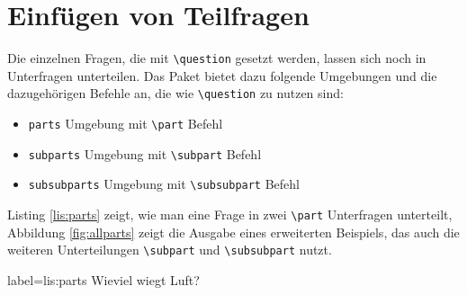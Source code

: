 \clearpage

\section{Einfügen von Teilfragen}

Die einzelnen Fragen, die mit \texttt{\textbackslash question} gesetzt werden, lassen sich noch in Unterfragen unterteilen. 
Das  Paket bietet dazu folgende Umgebungen und die dazugehörigen Befehle an, die wie \texttt{\textbackslash question} zu nutzen sind:

\begin{itemize}
	\item \texttt{parts} Umgebung mit \texttt{\textbackslash part} Befehl
	\item \texttt{subparts} Umgebung mit \texttt{\textbackslash subpart} Befehl
	\item \texttt{subsubparts} Umgebung mit \texttt{\textbackslash subsubpart} Befehl
\end{itemize}

Listing \ref{lis:parts} zeigt, wie man eine Frage in zwei \texttt{\textbackslash part} Unterfragen unterteilt, Abbildung \ref{fig:allparts} zeigt die Ausgabe eines erweiterten Beispiels, das auch die weiteren Unterteilungen \texttt{\textbackslash subpart} und \texttt{\textbackslash subsubpart} nutzt.

\begin{lfgwcode}{label={lis:parts}}
\question[5]
Wieviel wiegt Luft?

\end{lfgwcode}


